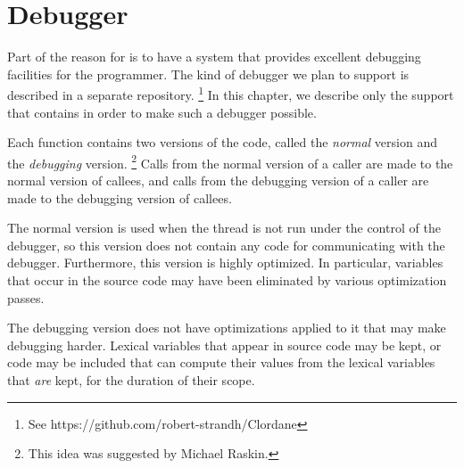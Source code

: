 \chapter{Debugger}
\label{chap-debugger}

Part of the reason for \sysname{} is to have a system that provides
excellent debugging facilities for the programmer.  The kind of
debugger we plan to support is described in a separate repository.%
\footnote{See https://github.com/robert-strandh/Clordane}  In this
chapter, we describe only the support that \sysname{} contains in
order to make such a debugger possible.

Each function contains two versions of the code, called the
\emph{normal} version and the \emph{debugging} version.%
\footnote{This idea was suggested by Michael Raskin.}
Calls from the normal version of a caller are made to the normal version
of callees, and calls from the debugging version of a caller are made to
the debugging version of callees.

The normal version is used when the thread is not run under the
control of the debugger, so this version does not contain any code for
communicating with the debugger.  Furthermore, this version is highly
optimized.  In particular, variables that occur in the source code may
have been eliminated by various optimization passes.

The debugging version does not have optimizations applied to it that
may make debugging harder.  Lexical variables that appear in source
code may be kept, or code may be included that can compute their
values from the lexical variables that \emph{are} kept, for the
duration of their scope.

